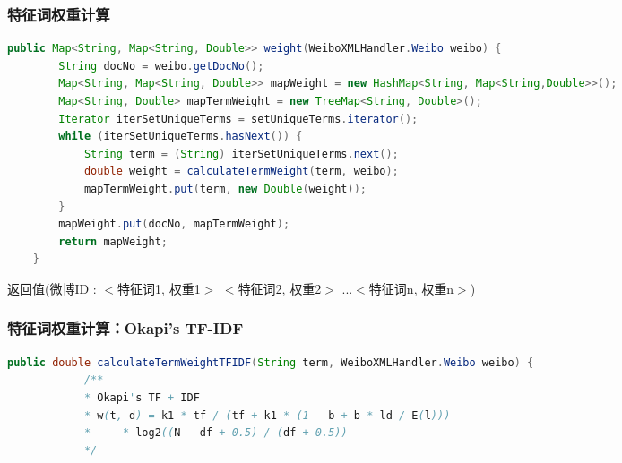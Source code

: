 \documentclass[CJKutf8, table]{beamer}
\begin{document}
\begin{CJK}{UTF8}{gbsn}
\begin{frame}[fragile]
  \frametitle{特征词权重计算}
  \lstset{language=Java,basicstyle=\ttfamily,commentstyle=\ttfamily}
  \begin{tiny}
    \begin{block}{}
      \begin{lstlisting}[language=Java]
    public Map<String, Map<String, Double>> weight(WeiboXMLHandler.Weibo weibo) {
        String docNo = weibo.getDocNo();
        Map<String, Map<String, Double>> mapWeight = new HashMap<String, Map<String,Double>>();
        Map<String, Double> mapTermWeight = new TreeMap<String, Double>();
        Iterator iterSetUniqueTerms = setUniqueTerms.iterator();
        while (iterSetUniqueTerms.hasNext()) {
            String term = (String) iterSetUniqueTerms.next();
            double weight = calculateTermWeight(term, weibo);
            mapTermWeight.put(term, new Double(weight));
        }
        mapWeight.put(docNo, mapTermWeight);
        return mapWeight;
    }
      \end{lstlisting}
    \end{block}
  \end{tiny}
  \pause
  \begin{tiny}
    \begin{block}{}
      返回值(微博ID : $<$特征词1, 权重1$>$ $<$特征词2, 权重2$>$ ...$<$特征词n, 权重n$>$)
    \end{block}
  \end{tiny}
\end{frame}

\begin{frame}[fragile]
  \frametitle{特征词权重计算：Okapi's TF-IDF}
  \lstset{language=Java,basicstyle=\ttfamily,commentstyle=\ttfamily}
  \begin{tiny}
    \begin{block}{}
      \begin{lstlisting}[language=Java]
        public double calculateTermWeightTFIDF(String term, WeiboXMLHandler.Weibo weibo) {
            /**
            * Okapi's TF + IDF
            * w(t, d) = k1 * tf / (tf + k1 * (1 - b + b * ld / E(l))) 
            *     * log2((N - df + 0.5) / (df + 0.5))
            */
            

\end{lstlisting}
\end{block}
\end{tiny}
\end{frame}
\end{CJK}
\end{document}
